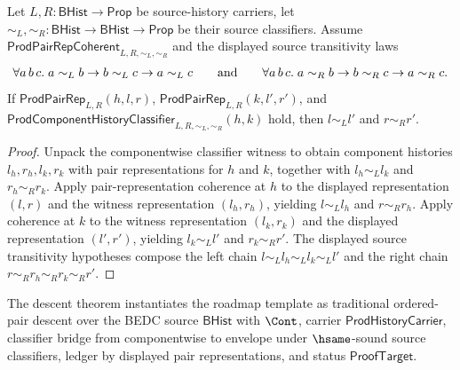\begin{theorem}
\label{thm:prod-component-history-classifier-inversion}
Let $L,R:\mathsf{BHist}\to\mathsf{Prop}$ be source-history carriers, let
$\sim_L,\sim_R:\mathsf{BHist}\to\mathsf{BHist}\to\mathsf{Prop}$ be their source
classifiers. Assume $\mathsf{ProdPairRepCoherent}_{L,R,\sim_L,\sim_R}$ and the
displayed source transitivity laws
$$
\forall a\,b\,c.\;a\sim_L b\to b\sim_L c\to a\sim_L c
\qquad\hbox{and}\qquad
\forall a\,b\,c.\;a\sim_R b\to b\sim_R c\to a\sim_R c.
$$
If
$\mathsf{ProdPairRep}_{L,R}(h,l,r)$,
$\mathsf{ProdPairRep}_{L,R}(k,l',r')$, and
$\mathsf{ProdComponentHistoryClassifier}_{L,R,\sim_L,\sim_R}(h,k)$ hold, then
$l\sim_L l'$ and $r\sim_R r'$.
\end{theorem}
\begin{proof}
Unpack the componentwise classifier witness to obtain component histories
$l_h,r_h,l_k,r_k$ with pair representations for $h$ and $k$, together with
$l_h\sim_L l_k$ and $r_h\sim_R r_k$. Apply pair-representation coherence at
$h$ to the displayed representation $(l,r)$ and the witness representation
$(l_h,r_h)$, yielding $l\sim_L l_h$ and $r\sim_R r_h$. Apply coherence at
$k$ to the witness representation $(l_k,r_k)$ and the displayed
representation $(l',r')$, yielding $l_k\sim_L l'$ and $r_k\sim_R r'$. The
displayed source transitivity hypotheses compose the left chain
$l\sim_L l_h\sim_L l_k\sim_L l'$ and the right chain
$r\sim_R r_h\sim_R r_k\sim_R r'$.
\end{proof}

The descent theorem instantiates the roadmap template as traditional ordered-pair descent over the BEDC source $\mathsf{BHist}$ with $\Cont$, carrier $\mathsf{ProdHistoryCarrier}$, classifier bridge from componentwise to envelope under $\hsame$-sound source classifiers, ledger by displayed pair representations, and status $\mathsf{ProofTarget}$.

